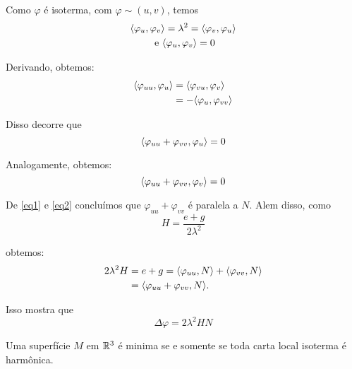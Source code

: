 \begin{demonstracao}
	Como $\varphi$ é isoterma, com $\varphi \sim (u, v)$, temos
	\begin{gather*}
	\langle \varphi_u,\varphi_v \rangle = \lambda^2 = \langle \varphi_v,\varphi_u \rangle \\
	\text{ e } \langle \varphi_u,\varphi_v \rangle = 0
	\end{gather*}
	
	Derivando, obtemos:
	\begin{align*}
	\langle \varphi_{uu},\varphi_u \rangle &= \langle \varphi_{vu},\varphi_v \rangle\\
	&= - \langle \varphi_u,\varphi_{vv} \rangle
	\end{align*}
	
	Disso decorre que
	\begin{equation}\label{eq1}
	\langle \varphi_{uu} + \varphi_{vv},\varphi_u \rangle = 0
	\end{equation}
	
	Analogamente, obtemos:
	\begin{equation}\label{eq2}
	\langle \varphi_{uu} + \varphi_{vv},\varphi_v \rangle = 0
	\end{equation}
	
	De \ref{eq1} e \ref{eq2} concluímos que $\varphi_{uu} + \varphi_{vv}$ é paralela a $N$. Alem disso, como
	\begin{equation}
	H = \frac{e+g}{2 \lambda^2}
	\end{equation}
	
	obtemos:
	\begin{align*}
	2 \lambda^2 H &= e + g = \langle \varphi_{uu},N \rangle + \langle \varphi_{vv},N \rangle\\
	&= \langle \varphi_{uu} + \varphi_{vv},N \rangle.
	\end{align*}
	
	Isso mostra que
	\begin{equation}
	\Delta \varphi = 2 \lambda^2 H N
	\end{equation}
\end{demonstracao}

\begin{corolario}
	Uma superfície $M$ em $\mathbb{R}^3$ é minima se e somente se toda carta local isoterma é harmônica.
\end{corolario}

